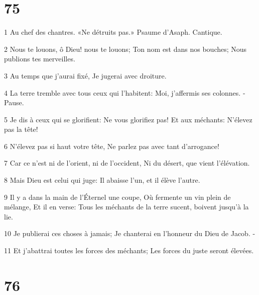 \chapter{75}

\par 1 Au chef des chantres. «Ne détruits pas.» Psaume d'Asaph. Cantique.
\par 2 Nous te louons, ô Dieu! nous te louons; Ton nom est dans nos bouches; Nous publions tes merveilles.
\par 3 Au temps que j'aurai fixé, Je jugerai avec droiture.
\par 4 La terre tremble avec tous ceux qui l'habitent: Moi, j'affermis ses colonnes. -Pause.
\par 5 Je dis à ceux qui se glorifient: Ne vous glorifiez pas! Et aux méchants: N'élevez pas la tête!
\par 6 N'élevez pas si haut votre tête, Ne parlez pas avec tant d'arrogance!
\par 7 Car ce n'est ni de l'orient, ni de l'occident, Ni du désert, que vient l'élévation.
\par 8 Mais Dieu est celui qui juge: Il abaisse l'un, et il élève l'autre.
\par 9 Il y a dans la main de l'Éternel une coupe, Où fermente un vin plein de mélange, Et il en verse: Tous les méchants de la terre sucent, boivent jusqu'à la lie.
\par 10 Je publierai ces choses à jamais; Je chanterai en l'honneur du Dieu de Jacob. -
\par 11 Et j'abattrai toutes les forces des méchants; Les forces du juste seront élevées.

\chapter{76}

